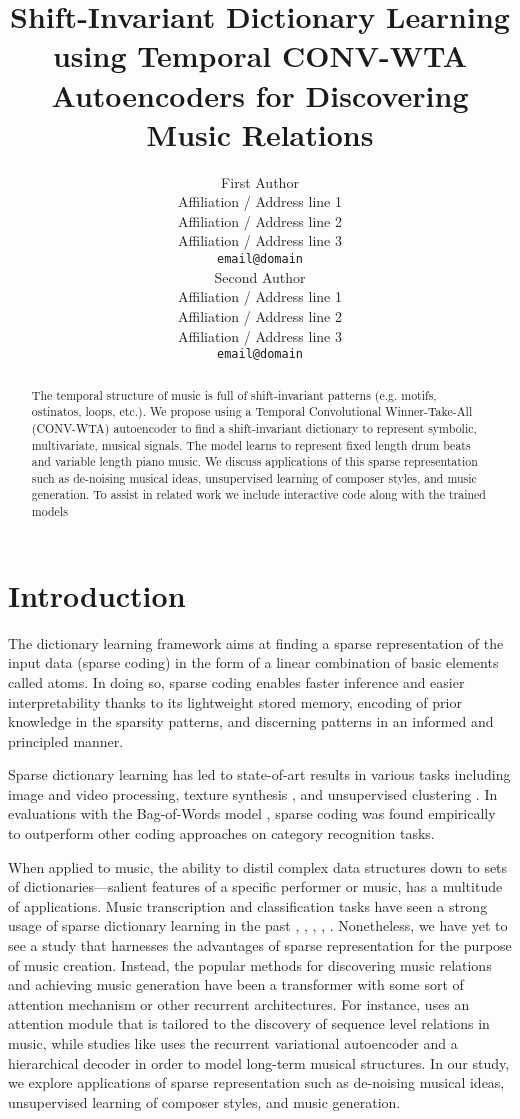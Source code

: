 \documentclass[11pt,a4paper]{article}
\title{Shift-Invariant Dictionary Learning using Temporal CONV-WTA Autoencoders for Discovering Music Relations }
\author{First Author \\
  Affiliation / Address line 1 \\
  Affiliation / Address line 2 \\
  Affiliation / Address line 3 \\
  \texttt{email@domain} \\\And
  Second Author \\
  Affiliation / Address line 1 \\
  Affiliation / Address line 2 \\
  Affiliation / Address line 3 \\
  \texttt{email@domain} \\}
\date{}
\begin{document}
\maketitle
\begin{abstract}
The temporal structure  of music is full of shift-invariant patterns (e.g. motifs, ostinatos, loops, etc.). We propose using a Temporal Convolutional Winner-Take-All (CONV-WTA) autoencoder to find a shift-invariant dictionary to represent symbolic, multivariate, musical signals. The model learns to represent fixed length drum beats and variable length piano music. We discuss applications of this sparse representation such as de-noising musical ideas, unsupervised learning of composer styles, and music generation. To assist in related work we include interactive code along with the trained models

\end{abstract}

\section{Introduction}

The dictionary learning framework aims at finding a sparse representation of the input data (sparse coding) in the form of a linear combination of basic elements called atoms. In doing so, sparse coding enables faster inference and easier interpretability thanks to its lightweight stored memory, encoding of prior knowledge in the sparsity patterns, and discerning patterns in an informed and principled manner.  

 Sparse dictionary learning has led to state-of-art results in various tasks including image and video processing, texture synthesis \cite{Peyre2009}, and unsupervised clustering \cite{Ramrez2010ClassificationAC}. In evaluations with the Bag-of-Words model \cite{7439823}, sparse coding was found empirically to outperform other coding approaches on category recognition tasks.  

When applied to music, the ability to distil complex data structures down to sets of dictionaries—salient features of a specific performer or music, has a multitude of applications. Music transcription and classification tasks have seen a strong usage of sparse dictionary learning in the past \cite{Grosse2007} \cite{Costantini2013}, \cite{Blumensath2006}, \cite{SrinivasM2014}, \cite{Srinivas2014}, \cite{Cogliati2016}. Nonetheless, we have yet to see a study that harnesses the advantages of sparse representation for the purpose of music creation. Instead, the popular methods for discovering music relations and achieving music generation have been a transformer with some sort of attention mechanism or other recurrent architectures. For instance, \cite{JiangJunyan2020} uses an attention module that is tailored to the discovery of sequence level relations in music, while studies like \cite{Roberts2018} uses the recurrent variational autoencoder and a hierarchical decoder in order to model long-term musical structures. In our study, we explore applications of sparse representation such as de-noising musical ideas, unsupervised learning of composer styles, and music generation.
\end{document}
